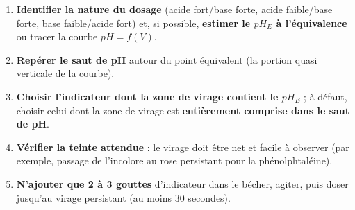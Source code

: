 \documentclass[11pt]{article}
\begin{document}
\begin{methode}
\begin{enumerate}
  \item \textbf{Identifier la nature du dosage} (acide fort/base forte, acide faible/base forte, base faible/acide fort) et, si possible, \textbf{estimer le $pH_E$ à l'équivalence} ou tracer la courbe $pH = f(V)$.
  \item \textbf{Repérer le saut de pH} autour du point équivalent (la portion quasi verticale de la courbe).
  \item \textbf{Choisir l'indicateur dont la zone de virage contient le $pH_E$} ; à défaut, choisir celui dont la zone de virage est \textbf{entièrement comprise dans le saut de pH}.
  \item \textbf{Vérifier la teinte attendue} : le virage doit être net et facile à observer (par exemple, passage de l'incolore au rose persistant pour la phénolphtaléine).
  \item \textbf{N'ajouter que 2 à 3 gouttes} d'indicateur dans le bécher, agiter, puis doser jusqu'au virage persistant (au moins 30 secondes).
\end{enumerate}
\end{methode}
\end{document}
